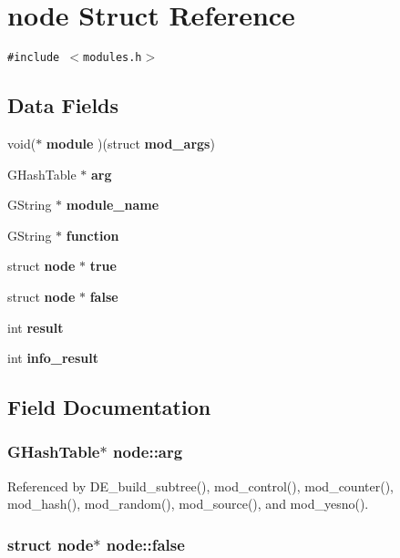 \section{node Struct Reference}
\label{structnode}
{\tt \#include $<$modules.h$>$}

\subsection*{Data Fields}
\begin{CompactItemize}
\item 
void($\ast$ {\bf module} )(struct {\bf mod\_\-args})
\item 
GHashTable $\ast$ {\bf arg}
\item 
GString $\ast$ {\bf module\_\-name}
\item 
GString $\ast$ {\bf function}
\item 
struct {\bf node} $\ast$ {\bf true}
\item 
struct {\bf node} $\ast$ {\bf false}
\item 
int {\bf result}
\item 
int {\bf info\_\-result}
\end{CompactItemize}


\subsection{Field Documentation}
\subsubsection[{arg}]{\setlength{\rightskip}{0pt plus 5cm}GHashTable$\ast$ {\bf node::arg}}\label{structnode_89bef375bfbc9b2e52bcf3c42b2dc7c9}




Referenced by DE\_\-build\_\-subtree(), mod\_\-control(), mod\_\-counter(), mod\_\-hash(), mod\_\-random(), mod\_\-source(), and mod\_\-yesno().
\subsubsection[{false}]{\setlength{\rightskip}{0pt plus 5cm}struct {\bf node}$\ast$ {\bf node::false}\hspace{0.3cm}{\tt  [read]}}\label{structnode_be3a1fc1ef85bec9a49758c39e10fecb}




